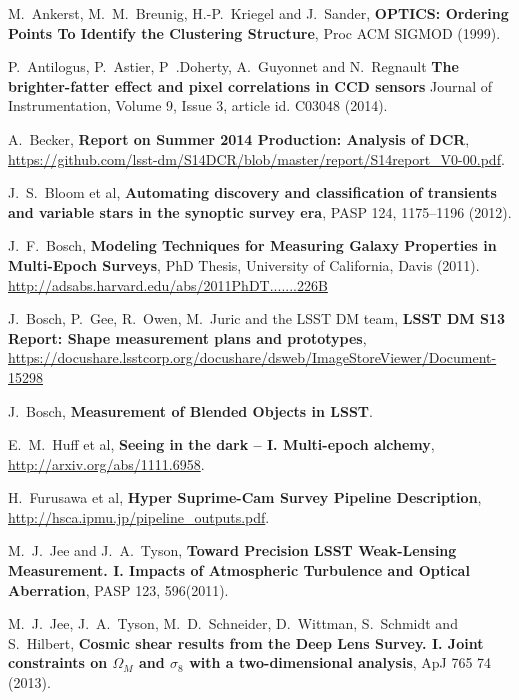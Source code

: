 \documentclass[12pt]{article}
\begin{document}
\clearpage

\begin{thebibliography}{10}

 M.~Ankerst, M.~M.~Breunig, H.-P.~Kriegel and J.~Sander,
  \textbf{OPTICS: Ordering Points To Identify the Clustering Structure},
  Proc ACM SIGMOD (1999).

 P.~Antilogus, P.~Astier, P~.Doherty, A.~Guyonnet and N.~Regnault
  \textbf{The brighter-fatter effect and pixel correlations in CCD sensors}
  Journal of Instrumentation, Volume 9, Issue 3, article id. C03048 (2014).

 A.~Becker,
  \textbf{Report on Summer 2014 Production: Analysis of DCR},
  \url{https://github.com/lsst-dm/S14DCR/blob/master/report/S14report_V0-00.pdf}.

 J.~S.~Bloom et al,
  \textbf{Automating discovery and classification of transients and variable stars in the synoptic survey era},
  PASP 124, 1175--1196 (2012).

 J.~F.~Bosch,
  \textbf{Modeling Techniques for Measuring Galaxy Properties in Multi-Epoch Surveys},
  PhD Thesis, University of California, Davis (2011). \url{http://adsabs.harvard.edu/abs/2011PhDT.......226B}

 J.~Bosch, P.~Gee, R.~Owen, M.~Juric and the LSST DM team,
  \textbf{LSST DM S13 Report: Shape measurement plans and prototypes},
  \url{https://docushare.lsstcorp.org/docushare/dsweb/ImageStoreViewer/Document-15298}

 J.~Bosch,
  \textbf{Measurement of Blended Objects in LSST}.

 E.~M.~Huff et al,
  \textbf{Seeing in the dark -- I. Multi-epoch alchemy},
  \url{http://arxiv.org/abs/1111.6958}.

 H.~Furusawa et al,
  \textbf{Hyper Suprime-Cam Survey Pipeline Description},
  \url{http://hsca.ipmu.jp/pipeline_outputs.pdf}.

 M.~J.~Jee and J.~A.~Tyson,  \textbf{Toward
  Precision LSST Weak-Lensing Measurement. I. Impacts of Atmospheric
  Turbulence and Optical Aberration}, PASP 123, 596(2011).

 M.~J.~Jee, J.~A.~Tyson, M.~D.~Schneider, D.~Wittman, S.~Schmidt and S.~Hilbert,
  \textbf{Cosmic shear results from the Deep Lens Survey. I. Joint constraints on $\Omega_M$ and $\sigma_8$ with a two-dimensional analysis},
  ApJ 765 74 (2013).


\end{thebibliography}
\end{document}
